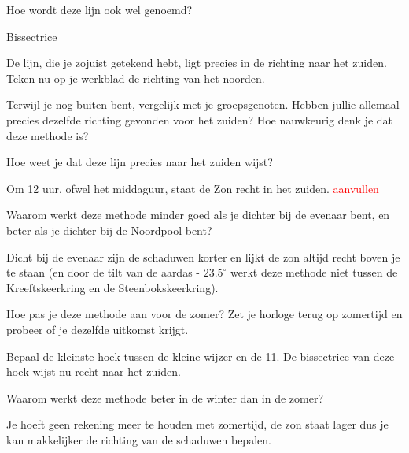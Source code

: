 \begin{opgave}
    Hoe wordt deze lijn ook wel genoemd? 
    \begin{antwoord}
         Bissectrice
    \end{antwoord}
\end{opgave}

De lijn, die je zojuist getekend hebt, ligt precies in de richting naar het zuiden. Teken nu op je werkblad de richting van het noorden.

\begin{opgave}[\discussie]
    Terwijl je nog buiten bent, vergelijk met je groepsgenoten. Hebben jullie allemaal precies dezelfde richting gevonden voor het zuiden? Hoe nauwkeurig denk je dat deze methode is?
\end{opgave}

\begin{opgave}
    Hoe weet je dat deze lijn precies naar het zuiden wijst?
    \begin{antwoord}
        Om 12 uur, ofwel het middaguur, staat de Zon recht in het zuiden. \textcolor{red}{aanvullen}
    \end{antwoord}
\end{opgave}

\begin{opgave}
    Waarom werkt deze methode minder goed als je dichter bij de evenaar bent, en beter als je dichter bij de Noordpool bent? 
    \begin{antwoord}
        Dicht bij de evenaar zijn de schaduwen korter en lijkt de zon altijd recht boven je te staan (en door de tilt van de aardas - $23.5^{\circ}$ werkt deze methode niet tussen de Kreeftskeerkring en de Steenbokskeerkring).
    \end{antwoord}
\end{opgave}

\begin{opgave}[\schaar]
    Hoe pas je deze methode aan voor de zomer? Zet je horloge terug op zomertijd en probeer of je dezelfde uitkomst krijgt.
    \begin{antwoord}
        Bepaal de kleinste hoek tussen de kleine wijzer en de 11. De bissectrice van deze hoek wijst nu recht naar het zuiden.   
    \end{antwoord}
\end{opgave}

\begin{opgave}
    Waarom werkt deze methode beter in de winter dan in de zomer? 
    \begin{antwoord}
        Je hoeft geen rekening meer te houden met zomertijd, de zon staat lager dus je kan makkelijker de richting van de schaduwen bepalen.
    \end{antwoord}
\end{opgave}

